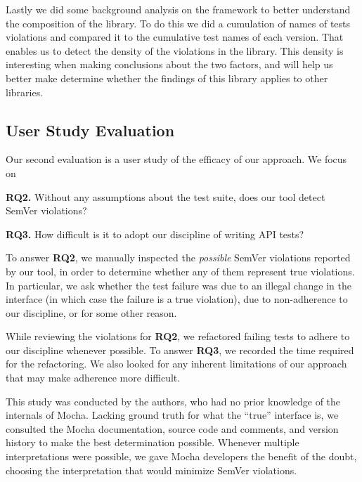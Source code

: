 Lastly we did some background analysis on the framework to better
understand the composition of the library. To do this we did a
cumulation of names of tests violations and compared it to the
cumulative test names of each version.  That enables us to detect the
density of the violations in the library. This density is interesting
when making conclusions about the two factors, and will help us better
make determine whether the findings of this library applies to other 
libraries.

\subsection{User Study Evaluation}
Our second evaluation is a user study of the efficacy of our
approach. We focus on 

{\bf RQ2.} Without any assumptions about the test suite, does our tool
detect SemVer violations?

{\bf RQ3.} How difficult is it to adopt our discipline of writing API
tests?

To answer {\bf RQ2}, we manually inspected the {\em possible\/} SemVer
violations reported by our tool, in order to determine whether any of
them represent true violations. In particular, we ask whether the test
failure was due to an illegal change in the interface (in which case
the failure is a true violation), due to non-adherence to our
discipline, or for some other reason.

While reviewing the violations for {\bf RQ2}, we refactored failing
tests to adhere to our discipline whenever possible. To answer {\bf
  RQ3}, we recorded the time required for the refactoring. We also
looked for any inherent limitations of our approach that may make
adherence more difficult.

This study was conducted by the authors, who had no prior knowledge of
the internals of Mocha. Lacking ground truth for what the ``true''
interface is, we consulted the Mocha documentation, source code and
comments, and version history to make the best determination
possible. Whenever multiple interpretations were possible, we gave
Mocha developers the benefit of the doubt, choosing the interpretation
that would minimize SemVer violations.


